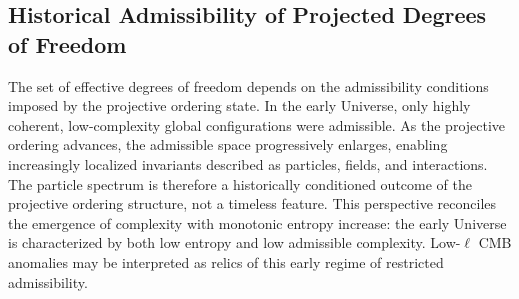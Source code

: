 \subsection{Historical Admissibility of Projected Degrees of Freedom}
  \label{subsec:historical-admissibility}

  The set of effective degrees of freedom depends on the admissibility
  conditions imposed by the projective ordering state.
  In the early Universe, only highly coherent, low-complexity global
  configurations were admissible.
  As the projective ordering advances, the admissible space progressively
  enlarges, enabling increasingly localized invariants described as
  particles, fields, and interactions.
  The particle spectrum is therefore a historically conditioned outcome of
  the projective ordering structure, not a timeless feature.
  This perspective reconciles the emergence of complexity with monotonic
  entropy increase: the early Universe is characterized by both low entropy
  and low admissible complexity.
  Low-$\ell$ CMB anomalies may be interpreted as relics of this early
  regime of restricted admissibility.
